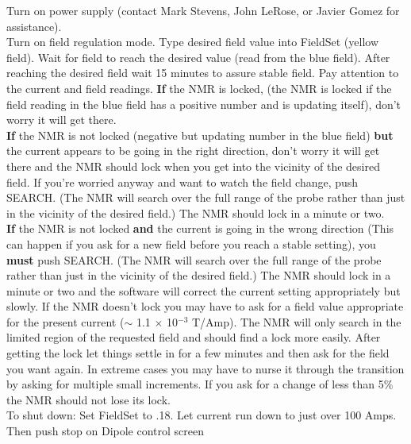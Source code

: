 Turn on power supply (contact Mark Stevens, John LeRose, 
or Javier Gomez for assistance).\\


Turn on field regulation mode. Type desired field value into FieldSet 
(yellow field). Wait for field to reach the desired value (read from the blue 
field). After reaching the desired field wait 15 minutes to assure stable field.
Pay attention to the current and field readings.
{\bf If} the NMR is locked, (the NMR is locked if the field reading in 
the blue field has a positive number and is updating itself), don't 
worry it will get there.\\

{\bf If} the NMR is not locked (negative but updating number in the blue 
field) {\bf but} the current appears to be going in the right direction, 
 don't worry it will get there and the NMR should lock when you get into 
the vicinity of the desired field.  If you're worried anyway and want to 
watch the field change, push SEARCH.  (The NMR will search over the 
full range of the probe rather than just in the vicinity of the desired 
field.)  The NMR should lock in a minute or two.\\

{\bf If} the NMR is not locked {\bf and} the current is going in the 
wrong direction (This can happen if you ask for a new field before you 
reach a stable setting), you {\bf must} push SEARCH.  (The NMR will 
search over the full range of the probe rather than just in the vicinity 
of the desired field.)  The NMR should lock in a minute or two and the 
software will correct the current setting appropriately but slowly.  If 
the NMR doesn't lock you may have to ask for a field value appropriate 
for the present current ($\sim$ 1.1 $\times$ 10$^{-3}$ T/Amp).  The NMR 
will only search in the limited region of the requested field and should 
find a lock more easily.  After getting the lock let things settle in 
for a few minutes and then ask for the field you want again.  In extreme 
cases you may have to nurse it through the transition by asking for 
multiple small increments.  If you ask for a change of less than 5\% the 
NMR should not lose its lock.\\

\noindent To shut down:  Set FieldSet to .18.  Let current run down to 
just over 100 Amps.  Then push stop on Dipole control screen\\


